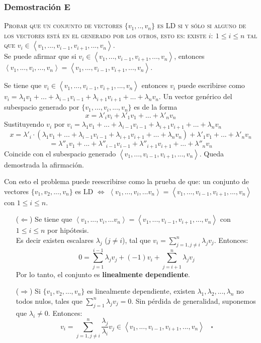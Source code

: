 \documentclass[a4paper,12pt]{article}
\begin{document}
\subsubsection{Demostración E}
\textsc{Probar que un conjunto de vectores $\{v_1,..,v_n\}$ es LD si y sólo si alguno de los vectores está en el generado por los otros, esto es: existe $i: \ 1\leq i\leq n $ tal que $v_i\in\left \langle v_1,...,v_{i-1},v_{i+1},...,v_n \right \rangle $.} \\
Se puede afirmar que si $v_i\in \left \langle v_1,...,v_{i-1},v_{i+1},...,v_n \right \rangle$, entonces \\ $\left \langle v_1,...,v_i,...,v_n \right \rangle = \left \langle v_1,...,v_{i-1},v_{i+1},...,v_n \right \rangle$.
\begin{bbox}
    Se tiene que $v_i \in \left \langle v_1,...,v_{i-1},v_{i+1},...,v_n \right \rangle$ entonces $v_i$ puede escribirse como $v_i=\lambda_1v_1+...+\lambda_{i-1}v_{i-1}+\lambda_{i+1}v_{i+1}+...+\lambda_nv_n$.
    \newline Un vector genérico del subespacio generado por $\{v_1,...,v_i,...,v_n \}$ es de la forma
    $$
    x = \lambda'_iv_i+\lambda'_1v_1+...+\lambda'_nv_n
    $$
    Sustituyendo $v_i$ por $v_i=\lambda_1v_1+...+\lambda_{i-1}v_{i-1}+\lambda_{i+1}v_{i+1}+...+\lambda_nv_n$
    $$
    x = \lambda'_i\cdot (\lambda_1v_1+...+\lambda_{i-1}v_{i-1}+\lambda_{i+1}v_{i+1}+...+\lambda_nv_n) + \lambda'_1v_1+...+\lambda'_nv_n 
    $$
    $$
    = \lambda''_1v_1+...+\lambda''_{i-1}v_{i-1}+\lambda''_{i+1}v_{i+1}+...+\lambda''_nv_n
    $$
    Coincide con el subespacio generado $\left \langle v_1,...,v_{i-1},v_{i+1},...,v_n \right \rangle$. Queda demostrada la afirmación.
\end{bbox}

Con esto el problema puede reescribirse como la prueba de que: un conjunto de vectores $\{v_1,v_2,...,v_n\}$ es LD $\Leftrightarrow$ $\left \langle v_1,...,v_i,...v_n \right \rangle = \left \langle v_1,...,v_{i-1},v_{i+1},...,v_n \right \rangle$ con $1\leq i\leq n$.
\begin{itemize}
    \item[($\Leftarrow$)] Se tiene que $\left \langle v_1,...,v_i,...v_n \right \rangle = \left \langle v_1,...,v_{i-1},v_{i+1},...,v_n \right \rangle$ con $1\leq i\leq n$ por hipótesis. \\
    Es decir existen escalares $\lambda_j$ ($j\neq i$), tal que
    $
    v_i= \sum_{j=1, j\neq i}^{n} \lambda_jv_j$. 
    Entonces:
    $$
    0 = \sum_{j=1}^{i-1}\lambda_jv_j+(-1)v_i+\sum_{j= i+1}^{n}\lambda_jv_j
    $$
    Por lo tanto, el conjunto es \textbf{linealmente dependiente}.
    \item[($\Rightarrow$)] Si $\{v_1,v_2,...,v_n\}$ es linealmente dependiente, existen $\lambda_1,\lambda_2,...,\lambda_n$ no todos nulos, tales que $\sum_{j=1}^{n}\lambda_jv_j=0$. Sin pérdida de generalidad, suponemos que $\lambda_i\neq 0$. Entonces:
    $$
    v_i=\sum_{j=1, j\neq i}^{n}\frac{\lambda_j}{\lambda_i}v_j \in \left \langle v_1,...,v_{i-1},v_{i+1},...,v_n \right \rangle  \ \ \ \ \square
    $$
\end{itemize}
\end{document}
